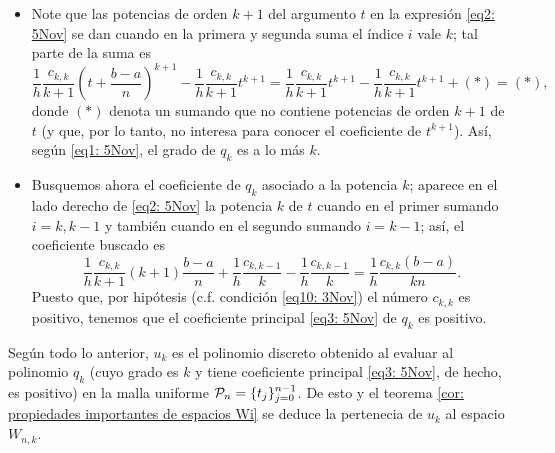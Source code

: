 \begin{itemize}
\item Note que las potencias de orden $k+1$ del argumento
$t$ en la expresión \eqref{eq2: 5Nov}
se dan
cuando en la primera y segunda suma el índice $i$
vale $k$; 
tal parte de la suma es 
\begin{equation}
\label{eq1: 5Nov}
\frac{1}{h} \frac{c_{k,k}}{k+1} \left(t+\frac{b-a}{n} \right)^{k+1}-
\frac{1}{h} \frac{c_{k,k}}{k+1} t^{k+1}=
\frac{1}{h} \frac{c_{k,k}}{k+1} t^{k+1}-\frac{1}{h} \frac{c_{k,k}}{k+1} t^{k+1}+ (*)=(*),
\end{equation} 
donde $(*)$ denota un sumando que no contiene potencias de orden
$k+1$ de $t$ (y que, por lo tanto, no interesa para conocer
el coeficiente de $t^{k+1}$).
Así, según \eqref{eq1: 5Nov}, el grado
de $q_{k}$ es a lo más $k$.
\item Busquemos ahora el coeficiente de $q_{k}$ asociado a la
potencia $k$; aparece en
el lado derecho de \eqref{eq2: 5Nov} la potencia $k$
de $t$ cuando en el primer sumando $i=k, k-1$
y también cuando en el segundo sumando $i=k-1$;
así, el coeficiente buscado es
\begin{equation}
\label{eq3: 5Nov}
\frac{1}{h} \frac{c_{k,k}}{k+1}(k+1)\frac{b-a}{n} 
+\frac{1}{h} \frac{c_{k,k-1}}{k}-
\frac{1}{h} \frac{c_{k,k-1}}{k} = 
\frac{1}{h} \frac{c_{k,k}(b-a)}{kn}.
\end{equation}
Puesto que, por hipótesis (c.f. 
condición \eqref{eq10: 3Nov})
el número $c_{k,k}$ es positivo, tenemos que 
el coeficiente principal \ref{eq3: 5Nov}
de $q_{k}$ es positivo.
\end{itemize}


Según todo lo anterior, $u_{k}$
es el polinomio discreto obtenido al evaluar
al polinomio $q_{k}$ (cuyo grado es $k$ y tiene
coeficiente principal \eqref{eq3: 5Nov},
de hecho, es positivo)
en la malla uniforme 
$\mathcal{P}_{n}=\{t_{j}\}_{j=0}^{n-1}$.
De esto y el teorema 
\ref{cor: propiedades importantes de espacios Wi}
se deduce la pertenecia de $u_{k}$ al espacio $W_{n,k}$.
\QEDB
\vspace{0.2cm}

